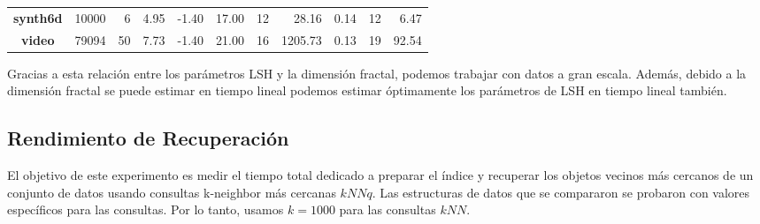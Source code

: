 \begin{table}[!t]
\begin{footnotesize}
\begin{tabular}{c|r|r|r|r|r|r|r|r|r|r|}
\multicolumn{1}{|c|}{\bf synth6d}               & 10000                 & 6        & 4.95     & -1.40      & 17.00       & 12                        & 28.16      & 0.14  & 12                    & 6.47                    \\
\multicolumn{1}{|c|}{\bf video}                 & 79094                 & 50       & 7.73     & -1.40      & 21.00       & 16                        & 1205.73     & 0.13  & 19                    & 92.54                   \\ 
\bottomrule
\end{tabular}
\end{footnotesize}
\end{table}
Gracias a esta relación entre los parámetros LSH y la dimensión fractal, podemos trabajar con datos a gran escala. Además, debido a la dimensión fractal se puede estimar en tiempo lineal podemos estimar óptimamente los parámetros de LSH en tiempo lineal también. 

\subsection{Rendimiento de Recuperación} %
El objetivo de este experimento es medir el tiempo total dedicado a preparar el índice y recuperar los objetos vecinos más cercanos de un conjunto de datos usando consultas k-neighbor más cercanas $ kNNq $. Las estructuras de datos que se compararon se probaron con valores específicos para las consultas. Por lo tanto, usamos $ k = 1000 $ para las consultas $ kNN $.

